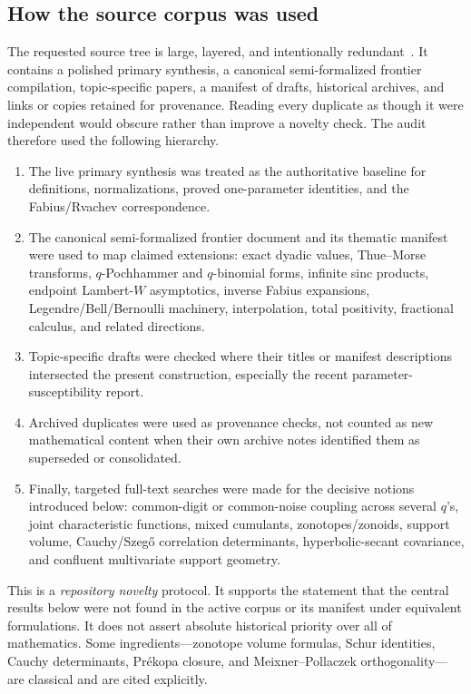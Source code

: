 \documentclass[11pt,a4paper]{article}
\theoremstyle{definition}
\theoremstyle{remark}
\begin{document}
\subsection{How the source corpus was used}

The requested source tree is large, layered, and intentionally redundant~\cite{ProveItPrimary,ProveItFrontier}.  It contains a polished primary synthesis, a canonical semi-formalized frontier compilation, topic-specific papers, a manifest of drafts, historical archives, and links or copies retained for provenance.  Reading every duplicate as though it were independent would obscure rather than improve a novelty check.  The audit therefore used the following hierarchy.

\begin{enumerate}[leftmargin=2.1em,label=\textbf{A\arabic*.}]
\item The live primary synthesis was treated as the authoritative baseline for definitions, normalizations, proved one-parameter identities, and the Fabius/Rvachev correspondence.
\item The canonical semi-formalized frontier document and its thematic manifest were used to map claimed extensions: exact dyadic values, Thue--Morse transforms, $q$-Pochhammer and $q$-binomial forms, infinite sinc products, endpoint Lambert-$W$ asymptotics, inverse Fabius expansions, Legendre/Bell/Bernoulli machinery, interpolation, total positivity, fractional calculus, and related directions.
\item Topic-specific drafts were checked where their titles or manifest descriptions intersected the present construction, especially the recent parameter-susceptibility report.
\item Archived duplicates were used as provenance checks, not counted as new mathematical content when their own archive notes identified them as superseded or consolidated.
\item Finally, targeted full-text searches were made for the decisive notions introduced below: common-digit or common-noise coupling across several $q$'s, joint characteristic functions, mixed cumulants, zonotopes/zonoids, support volume, Cauchy/Szeg\H{o} correlation determinants, hyperbolic-secant covariance, and confluent multivariate support geometry.
\end{enumerate}

This is a \emph{repository novelty} protocol.  It supports the statement that the central results below were not found in the active corpus or its manifest under equivalent formulations.  It does not assert absolute historical priority over all of mathematics.  Some ingredients---zonotope volume formulas, Schur identities, Cauchy determinants, Pr\'ekopa closure, and Meixner--Pollaczek orthogonality---are classical and are cited explicitly.
\end{document}

